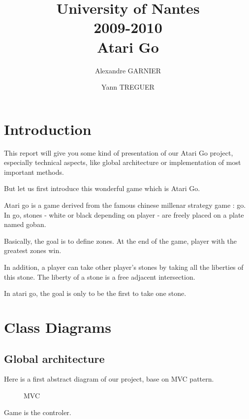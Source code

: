 \documentclass[12pt,a4paper,utf8x]{report}
\title
{
	\normalsize{
	University of Nantes\\
	2009-2010}\\
	\vspace{15mm}
	\Huge{Atari Go}
}
\author{Alexandre GARNIER \and Yann TREGUER \\
	\vspace{45mm}
}
\begin{document}
	\maketitle

	\tableofcontents
	
	\clearpage
	
	\begin{onehalfspace}

    \chapter{Introduction}
    
	This report will give you some kind of presentation of our Atari Go project, especially technical aspects, like global architecture or implementation of most important methods.
	
	But let us first introduce this wonderful game which is Atari Go.
	
	Atari go is a game derived from the famous chinese millenar strategy game : go. In go, stones - white or black depending on player - are freely placed on a plate named goban.
	
	Basically, the goal is to define zones. At the end of the game, player with the greatest zones win.
	
	In addition, a player can take other player's stones by taking all the liberties of this stone. The liberty of a stone is a free adjacent intersection.
	
	In atari go, the goal is only to be the first to take one stone.
	
	\clearpage
	
	\chapter{Class Diagrams}
	
	\section{Global architecture}
	
	Here is a first abstract diagram of our project, base on MVC pattern.
	
	\begin{figure}[h!]
		\centering
		\caption{MVC}
		\label{mvc} 
	\end{figure}
	Game is the controler.
	

\end{onehalfspace}
\end{document}
